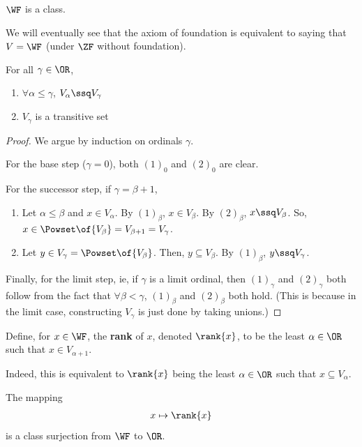 $\WF$ is a class.

We will eventually see that the axiom of foundation is equivalent to saying that $V = \WF$ (under $\ZF$ without foundation).

\begin{boxproposition}
    For all $\gamma \in \OR$,
    \begin{enumerate}[label = $\parenth{\arabic*}_{\gamma}$]
        \item $\forall \alpha \leq \gamma$, $V_{\alpha} \ssq V_{\gamma}$
        \item $V_{\gamma}$ is a transitive set
    \end{enumerate}
\end{boxproposition}
\begin{proof}
    We argue by induction on ordinals $\gamma$.

    For the base step ($\gamma = 0$), both $(1)_0$ and $(2)_0$ are clear.

    For the successor step, if $\gamma = \beta + 1$,
    \begin{enumerate}[label = $\parenth{\arabic*}_{\gamma}$]
        \item Let $\alpha \leq \beta$ and $x \in V_{\alpha}$. By $(1)_{\beta}$, $x \in V_{\beta}$. By $(2)_{\beta}$, $x \ssq V_{\beta}$. So, $x \in \Powset\of{V_{\beta}} = V_{\beta + 1} = V_{\gamma}$.

        \item Let $y \in V_{\gamma} = \Powset\of{V_{\beta}}$. Then, $y \subseteq V_{\beta}$. By $(1)_{\beta}$, $y \ssq V_{\gamma}$.
    \end{enumerate}

    Finally, for the limit step, ie, if $\gamma$ is a limit ordinal, then $(1)_{\gamma}$ and $(2)_{\gamma}$ both follow from the fact that $\forall \beta < \gamma$, $(1)_{\beta}$ and $(2)_{\beta}$ both hold. (This is because in the limit case, constructing $V_{\gamma}$ is just done by taking unions.)
\end{proof}

\begin{boxdefinition}[Rank]\label{Ch1:Def:Rank}
    Define, for $x \in \WF$, the \textbf{rank} of $x$, denoted $\rank{x}$, to be the least $\alpha \in \OR$ such that $x \in V_{\alpha + 1}$.
\end{boxdefinition}

Indeed, this is equivalent to $\rank{x}$ being the least $\alpha \in \OR$ such that $x \subseteq V_{\alpha}$.

\begin{boxproposition}
    The mapping
    \begin{align*}
        x \mapsto \rank{x}
    \end{align*}
    is a class surjection from $\WF$ to $\OR$.
\end{boxproposition}

